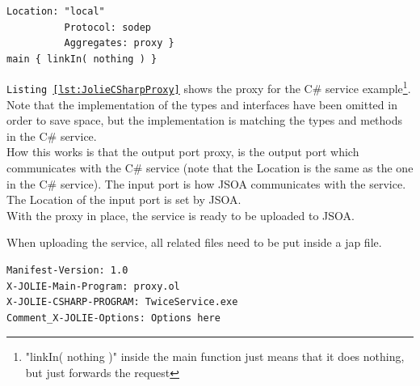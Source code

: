 \documentclass[12pt,a4paper]{article}
\begin{document}
\begin{lstlisting}[caption={Jolie-C\# proxy},label={lst:JolieCSharpProxy}]
          Location: "local"                                                                                                                                                                                  
          Protocol: sodep                                                                                                                                                                                    
          Aggregates: proxy }                                                                                                                                                                                                            
main { linkIn( nothing ) }   
\end{lstlisting}

\texttt{Listing \ref{lst:JolieCSharpProxy}} shows the proxy for the C\# service example\footnote{"linkIn( nothing )" inside the main function just means that it does nothing, but just forwards the request}. Note that the implementation of the types and interfaces have been omitted in order to save space, but the implementation is matching the types and methods in the C\# service.\\
How this works is that the output port proxy, is the output port which communicates with the C\# service (note that the Location is the same as the one in the C\# service). The input port is how JSOA communicates with the service. The Location of the input port is set by JSOA.\\
With the proxy in place, the service is ready to be uploaded to JSOA. 

When uploading the service, all related files need to be put inside a jap file. 

\begin{lstlisting}[caption={Updated jap file manifest},label={lst:updatedManifest}]
Manifest-Version: 1.0                                                                                                                                                                                        
X-JOLIE-Main-Program: proxy.ol                                                                                                                                                                                
X-JOLIE-CSHARP-PROGRAM: TwiceService.exe                                                                                                                                                                     
Comment_X-JOLIE-Options: Options here     
\end{lstlisting}
\end{document}
